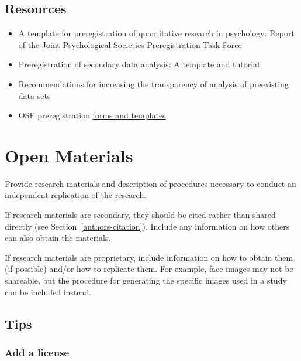 \documentclass[
  oneside]{book}
\providecommand{\tightlist}{%
  \setlength{\itemsep}{0pt}\setlength{\parskip}{0pt}}
\begin{document}
\hypertarget{resources-8}{%
\section{Resources}\label{resources-8}}

\begin{itemize}
\tightlist
\item
  A template for preregistration of quantitative research in psychology: Report of the Joint Psychological Societies Preregistration Task Force \citep{bosnjak2021template}
\item
  Preregistration of secondary data analysis: A template and tutorial \citep{van2021preregistration}
\item
  Recommendations for increasing the transparency of analysis of preexisting data sets \citep{weston2019recommendations}
\item
  OSF preregistration \href{https://osf.io/zab38/wiki/home/}{forms and templates}
\end{itemize}

\hypertarget{authors-open-materials}{%
\chapter{Open Materials}\label{authors-open-materials}}

Provide research materials and description of procedures necessary to conduct an independent replication of the research.

If research materials are secondary, they should be cited rather than shared directly (see Section~\ref{authors-citation}). Include any information on how others can also obtain the materials.

If research materials are proprietary, include information on how to obtain them (if possible) and/or how to replicate them. For example, face images may not be shareable, but the procedure for generating the specific images used in a study can be included instead.

\hypertarget{authors-materials-tips}{%
\section{Tips}\label{authors-materials-tips}}

\hypertarget{add-a-license}{%
\subsection{Add a license}\label{add-a-license}}
\end{document}
